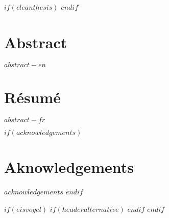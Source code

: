 
$if(cleanthesis)$
\clearpage
\customtitlebackpage
$endif$



\cleardoublepage
\begin{minipage}{\linewidth}

\chapter*{Abstract}
$abstract-en$


\newpage
\chapter*{Résumé}
$abstract-fr$

\end{minipage}
\cleardoublepage



$if(acknowledgements)$
\chapter*{Aknowledgements}
$acknowledgements$
$endif$


\cleardoublepage

$if(eisvogel)$
\pagestyle{eisvogel-header-footer}
$if(headeralternative)$
\rhead[$date$]{\rightmark}
$endif$
$endif$

